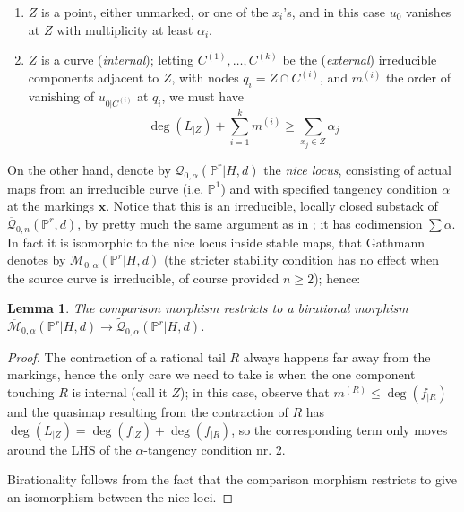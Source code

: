 \documentclass[11pt]{amsart}
\newcommand{\M}[4]{\overline{\mathcal M}_{#1,#2}(#3,#4)}
\newcommand{\Q}[4]{\overline{\mathcal Q}_{#1,#2}(#3,#4)}
\newcommand{\Qt}[4]{\widetilde{\mathcal Q}_{#1,#2}(#3,#4)}
\newcommand{\PP}{\mathbb P}
\renewcommand{\to}{\rightarrow}
\theoremstyle{plain}
\newtheorem{lem}[thm]{Lemma}
\theoremstyle{definition}
\begin{document}
\begin{enumerate}
\item $Z$ is a point, either unmarked, or one of the $x_i$'s, and in this case $u_0$ vanishes at $Z$ with multiplicity at least $\alpha_i$.
\item $Z$ is a curve (\emph{internal}); letting $C^{(1)},\ldots,C^{(k)}$ be the (\emph{external}) irreducible components adjacent to $Z$, with nodes $q_i=Z\cap C^{(i)}$, and $m^{(i)}$ the order of vanishing of $u_{0|C^{(i)}}$ at $q_i$, we must have
\[
\deg(L_{|Z})+\sum_{i=1}^k m^{(i)}\geq\sum_{x_j\in Z} \alpha_j
\]
\end{enumerate}

On the other hand, denote by $\mathcal Q_{0,\alpha}(\PP^r|H,d)$ the \emph{nice locus}, consisting of actual maps from an irreducible curve (i.e. $\PP^1$) and with specified tangency condition $\alpha$ at the markings $\mathbf x$. Notice that this is an irreducible, locally closed substack of $\Q{0}{n}{\PP^r}{d}$, by pretty much the same argument as in \cite[Lemma 1.8]{Ga}; it has codimension $\sum\alpha$. In fact it is isomorphic to the nice locus inside stable maps, that Gathmann denotes by $\mathcal M_{0,\alpha}(\PP^r|H,d)$ \cite[Def. 1.6]{Ga} (the stricter stability condition has no effect when the source curve is irreducible, of course provided $n\geq2$); hence:

\begin{lem}\label{lem:comparison}
The comparison morphism restricts to a birational morphism $\M{0}{\alpha}{\PP^r|H}{d}\to \Qt{0}{\alpha}{\PP^r|H}{d}$.
\end{lem}
\begin{proof}
The contraction of a rational tail $R$ always happens far away from the markings, hence the only care we need to take is when the one component touching $R$ is internal (call it $Z$); in this case, observe that $m^{(R)}\leq\deg(f_{|R})$ and the quasimap resulting from the contraction of $R$ has $\deg(L_{|Z})=\deg(f_{|Z})+\deg(f_{|R})$, so the corresponding term only moves around the LHS of the $\alpha$-tangency condition nr. 2.

Birationality follows from the fact that the comparison morphism restricts to give an isomorphism between the nice loci.
\end{proof}
\end{document}
